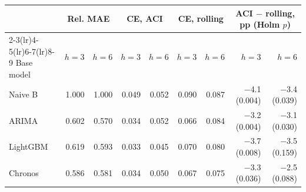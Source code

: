 \begin{tabular}{lrrrrrrrr}
\toprule
& \multicolumn{2}{c}{Rel. MAE} & \multicolumn{2}{c}{CE, ACI} & \multicolumn{2}{c}{CE, rolling} & \multicolumn{2}{c}{ACI $-$ rolling, pp (Holm $p$)} \\
\cmidrule(lr){2-3}\cmidrule(lr){4-5}\cmidrule(lr){6-7}\cmidrule(lr){8-9}
Base model & $h{=}3$ & $h{=}6$ & $h{=}3$ & $h{=}6$ & $h{=}3$ & $h{=}6$ & $h{=}3$ & $h{=}6$ \\
\midrule
Naive B & 1.000 & 1.000 & 0.049 & 0.052 & 0.090 & 0.087 & $-$4.1 (0.004) & $-$3.4 (0.039) \\
ARIMA & 0.602 & 0.570 & 0.034 & 0.052 & 0.066 & 0.084 & $-$3.2 (0.004) & $-$3.1 (0.030) \\
LightGBM & 0.619 & 0.593 & 0.033 & 0.045 & 0.070 & 0.080 & $-$3.7 (0.008) & $-$3.5 (0.159) \\
Chronos & 0.586 & 0.581 & 0.034 & 0.050 & 0.067 & 0.075 & $-$3.3 (0.036) & $-$2.5 (0.088) \\
\bottomrule
\end{tabular}
